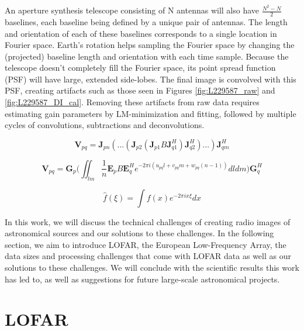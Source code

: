 An aperture synthesis telescope consisting of N antennas will also have $\frac{N^2 -N}{2}$ baselines, each baseline being defined by a unique pair of antennas. The length and orientation of each of these baselines corresponds to a single location in Fourier space. Earth's rotation helps sampling the Fourier space by changing the (projected) baseline length and orientation with each time sample\citep{christiansen1987radiotelescopes}. Because the telescope doesn't completely fill the Fourier space, its point spread function (PSF) will have large, extended side-lobes. The final image is convolved with this PSF, creating artifacts such as those seen in Figures \ref{fig:L229587_raw} and \ref{fig:L229587_DI_cal}. Removing these artifacts from raw data requires estimating gain parameters by LM-minimization and fitting\cite{prefactor3_gasperin}, followed by multiple cycles of convolutions, subtractions and deconvolutions\citep{Wendy_bootes, vanweeren2016, tasse2018}. 



\begin{equation}
    \bm{V}_{pq} = \bm{J}_{pn}(...(\bm{J}_{p2}(\bm{J}_{p1}B\bm{J}^H_{q1})\bm{J}^H_{q2})...)\bm{J}^H_{qm}
    \label{eq:RIME1}
\end{equation}


\begin{equation}
    \bm{V}_{pq} = \bm{G}_p \Bigg( \iint_{\mathit{lm}}\frac{1}{n} \bm{E}_p B \bm{E}^H_q e^{-2\pi i (u_{pq}l+v_{pq}m+w_{pq}(n-1))} d\mathit{l}d\mathit{m}\Bigg) \bm{G}^H_q
    \label{eq:RIME2}
\end{equation}


\begin{equation}
    \hat f(\xi) = \int f(x) e^{-2\pi i x \xi} dx 
    \label{eq:fourier}
\end{equation}

In this work, we will discuss the technical challenges of creating radio images of astronomical sources and our solutions to these challenges. In the following section, we aim to introduce LOFAR, the European Low-Frequency Array, the data sizes and processing challenges that come with LOFAR data as well as our solutions to these challenges. We will conclude with the scientific results this work has led to, as well as suggestions for future large-scale astronomical projects.

\section{LOFAR}

